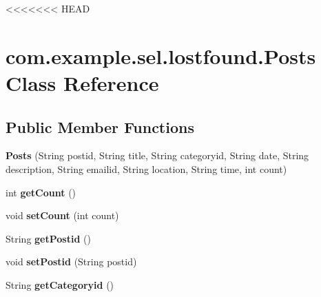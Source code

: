 <<<<<<< HEAD
\hypertarget{classcom_1_1example_1_1sel_1_1lostfound_1_1Posts}{\section{com.\-example.\-sel.\-lostfound.\-Posts Class Reference}
\label{classcom_1_1example_1_1sel_1_1lostfound_1_1Posts}
}
\subsection*{Public Member Functions}
\begin{DoxyCompactItemize}
\item 
\hypertarget{classcom_1_1example_1_1sel_1_1lostfound_1_1Posts_afde73b3796b65394584d6519f8cf755d}{{\bfseries Posts} (String postid, String title, String categoryid, String date, String description, String emailid, String location, String time, int count)}\label{classcom_1_1example_1_1sel_1_1lostfound_1_1Posts_afde73b3796b65394584d6519f8cf755d}

\item 
\hypertarget{classcom_1_1example_1_1sel_1_1lostfound_1_1Posts_afff96008f7ac224ad553becca11542cd}{int {\bfseries get\-Count} ()}\label{classcom_1_1example_1_1sel_1_1lostfound_1_1Posts_afff96008f7ac224ad553becca11542cd}

\item 
\hypertarget{classcom_1_1example_1_1sel_1_1lostfound_1_1Posts_abde1342814967338d4de2e4b977bc82b}{void {\bfseries set\-Count} (int count)}\label{classcom_1_1example_1_1sel_1_1lostfound_1_1Posts_abde1342814967338d4de2e4b977bc82b}

\item 
\hypertarget{classcom_1_1example_1_1sel_1_1lostfound_1_1Posts_a34e6ab517817eb471edaba45c315fee1}{String {\bfseries get\-Postid} ()}\label{classcom_1_1example_1_1sel_1_1lostfound_1_1Posts_a34e6ab517817eb471edaba45c315fee1}

\item 
\hypertarget{classcom_1_1example_1_1sel_1_1lostfound_1_1Posts_a46ba763542f61920dd2c463a9a095ffd}{void {\bfseries set\-Postid} (String postid)}\label{classcom_1_1example_1_1sel_1_1lostfound_1_1Posts_a46ba763542f61920dd2c463a9a095ffd}

\item 
\hypertarget{classcom_1_1example_1_1sel_1_1lostfound_1_1Posts_aee612c3070e43b57cd86fd812322a481}{String {\bfseries get\-Categoryid} ()}\label{classcom_1_1example_1_1sel_1_1lostfound_1_1Posts_aee612c3070e43b57cd86fd812322a481}


\end{DoxyCompactItemize}
